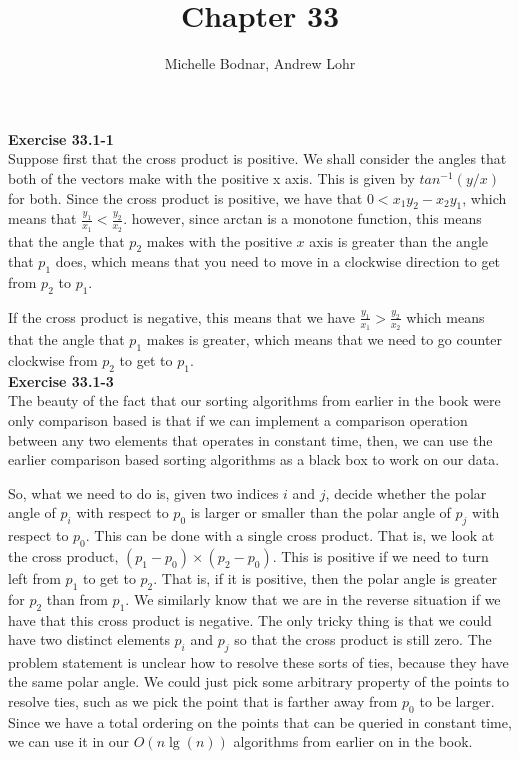 \documentclass{article}
\title{Chapter 33}
\author{Michelle Bodnar, Andrew Lohr}
\begin{document}
\maketitle
\noindent\textbf{Exercise 33.1-1}\\
Suppose first that the cross product is positive. We shall consider the angles that both of the vectors make with the positive x axis. This is given by $tan^{-1}(y/x)$ for both. Since the cross product is positive, we have that $0 < x_1 y_2 - x_2y_1$, which means that $\frac{y_1}{x_1} < \frac{y_2}{x_2}$. however, since arctan is a monotone function, this means that the angle that $p_2$ makes with the positive $x$ axis is greater than the angle that $p_1$ does, which means that you need to move in a clockwise direction to get from $p_2$ to $p_1$.

If the cross product is negative, this means that we have $\frac{y_1}{x_1} > \frac{y_2}{x_2}$ which means that the angle that $p_1$ makes is greater, which means that we need to go counter clockwise from $p_2$ to get to $p_1$.\\



\noindent\textbf{Exercise 33.1-3}\\

The beauty of the fact that our sorting algorithms from earlier in the book were only comparison based is that if we can implement a comparison operation between any two elements that operates in constant time, then, we can use the earlier comparison based sorting algorithms as a black box to work on our data.

So, what we need to do is, given two indices $i$ and $j$, decide whether the polar angle of $p_i$ with respect to $p_0$ is larger or smaller than the polar angle of $p_j$ with respect to $p_0$. This can be done with a single cross product. That is, we look at the cross product, $(p_1- p_0)\times(p_2-p_0)$. This is positive if we need to turn left from $p_1$ to get to $p_2$. That is, if it is positive, then the polar angle is greater for $p_2$ than from $p_1$. We similarly know that we are in the reverse situation if we have that this cross product is negative. The only tricky thing is that we could have two distinct elements $p_i$ and $p_j$ so that the cross product is still zero. The problem statement is unclear how to resolve these sorts of ties, because they have the same polar angle. We could just pick some arbitrary property of the points to resolve ties, such as we pick the point that is farther away from $p_0$ to be larger. Since we have a total ordering on the points that can be queried in constant time, we can use it in our $O(n\lg(n))$ algorithms from earlier on in the book.\\
\end{document}
